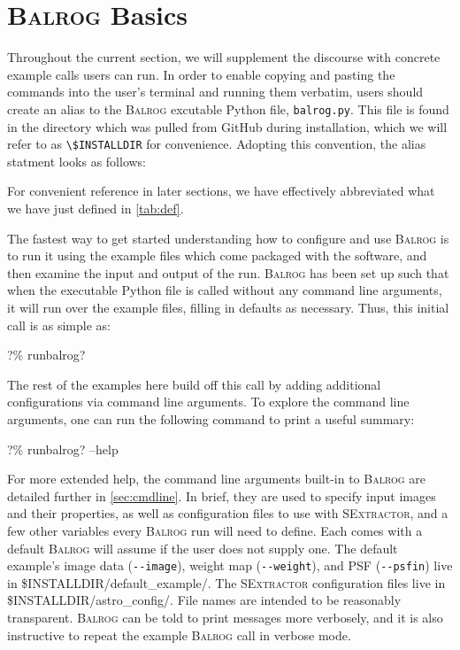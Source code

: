 \documentclass[12pt]{book}
\newcommand{\codett}[1]{\lstinline{#1}}
\newcommand{\py}{Python}
\newcommand{\balrog}{\textsc{Balrog}}
\newcommand{\sex}{\textsc{SExtractor}}
\newcommand{\opt}[1]{\codett{--#1}}
\newcommand{\bcmd}{\% runbalrog}
\begin{document}
\section{\balrog{} Basics}
\label{sec:quickbalrog}

Throughout the current section, we will supplement the discourse with concrete example calls users can run.
In order to enable copying and pasting the commands into the user's terminal and running them verbatim,
users should create an alias to the \balrog{} excutable \py{} file, \codett{balrog.py}. 
This file is found in the directory which was pulled from GitHub during installation,
which we will refer to as \codett{\$INSTALLDIR} for convenience.
Adopting this convention, the alias statment looks as follows:

\begin{cmdline}
\end{cmdline}

\noindent For convenient reference in later sections, we have effectively 
abbreviated what we have just defined in \autoref{tab:def}.

The fastest way to get started understanding how to configure and use \balrog{} is to
run it using the example files which come packaged with the software, and then examine the input
and output of the run. 
\balrog{} has been set up such that when the executable \py{}
file is called without any command line arguments, it will run over
the example files, filling in defaults as necessary. 
Thus, this initial call is as simple as:

\begin{cmdline}
?\bcmd{}?
\end{cmdline}

\noindent The rest of the examples here build off this call by adding additional configurations via command line arguments.
To explore the command line arguments, one can run the following command to print a useful summary:

\begin{cmdline}
?\bcmd{}? --help
\end{cmdline}

\noindent For more extended help, the command line arguments built-in to \balrog{} are detailed further in \autoref{sec:cmdline}.
In brief, they are used to specify input images and their properties, as well as configuration
files to use with \sex{}, and a few other variables every \balrog{} run will need to define. 
Each comes with a default \balrog{} will assume if the user does not supply one.
The default example's image data (\opt{image}), 
weight map (\opt{weight}), 
and PSF (\opt{psfin})
live in {\ttfamily \$INSTALLDIR/default\_example/}.
The \sex{} configuration files live in 
{\ttfamily \$INSTALLDIR/astro\_config/}. 
File names are intended to be reasonably transparent.
\balrog{} can be told to print messages more verbosely, 
and it is also instructive to repeat the example \balrog{} call in verbose mode.
\end{document}
